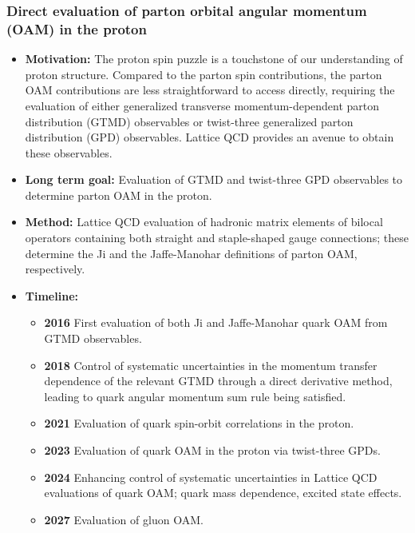 \documentclass[12pt,hyperpdf]{article}
\begin{document}
\subsubsection{Direct evaluation of parton orbital angular momentum (OAM) in
the proton}
\begin{itemize}
\item{\bf Motivation:} The proton spin puzzle is a touchstone of our
understanding of proton structure. Compared to the parton spin
contributions, the parton OAM contributions are less straightforward
to access directly, requiring the evaluation of either generalized
transverse momentum-dependent parton distribution (GTMD) observables
or twist-three generalized parton distribution (GPD) observables.
Lattice QCD provides an avenue to obtain these observables.
\item{\bf Long term goal:} Evaluation of GTMD and twist-three GPD observables
to determine parton OAM in the proton.
\item{\bf Method:} Lattice QCD evaluation of hadronic matrix elements of
bilocal operators containing both straight and staple-shaped gauge
connections; these determine the Ji and the Jaffe-Manohar definitions
of parton OAM, respectively.
\item{\bf Timeline:}
\begin{itemize}
\item{\bf 2016} First evaluation of both Ji and Jaffe-Manohar quark OAM from
GTMD observables.
\item{\bf 2018} Control of systematic uncertainties in the momentum transfer
dependence of the relevant GTMD through a direct derivative method,
leading to quark angular momentum sum rule being satisfied.
\item{\bf 2021} Evaluation of quark spin-orbit correlations in the proton.
\item{\bf 2023} Evaluation of quark OAM in the proton via twist-three GPDs.
\item{\bf 2024} Enhancing control of systematic uncertainties in Lattice QCD
evaluations of quark OAM; quark mass dependence, excited state effects.
\item{\bf 2027} Evaluation of gluon OAM.
\end{itemize}
\end{itemize}


\end{document}
